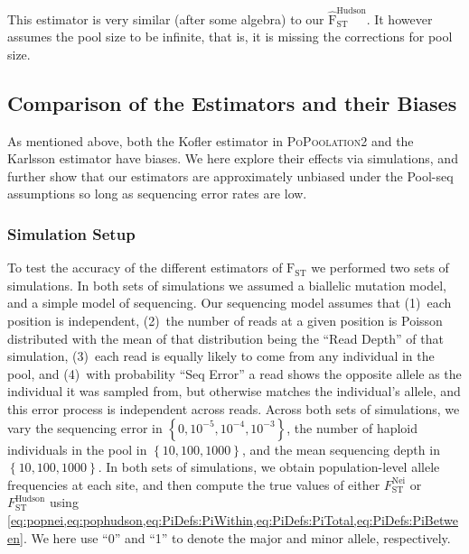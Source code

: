 \documentclass[letterpaper,fontsize=9pt,DIV=12]{scrartcl}
\newcommand\toolname{\textsc}
\newcommand{\neifst}{F_\text{ST}^\text{Nei}}
\newcommand{\hudsonfst}{F_\text{ST}^\text{Hudson}}
\begin{document}
This estimator is very similar (after some algebra) to our $\widehat{\text{F}}_\text{ST}^\text{Hudson}$.
It however assumes the pool size to be infinite, that is, it is missing the corrections for pool size.


\subsection{Comparison of the Estimators and their Biases}
\label{supp:sec:FST:sub:Comparison}

As mentioned above, both the Kofler estimator in \toolname{PoPoolation2} and the Karlsson estimator have biases.
We here explore their effects via simulations, and further show that our estimators are approximately unbiased under the Pool-seq assumptions so long as sequencing error rates are low.


\subsubsection*{Simulation Setup}
\label{supp:sec:FST:sub:Comparison:sub:Simulations}

To test the accuracy of the different estimators of $\text{F}_\text{ST}$ we performed two sets of simulations.  In both sets of simulations we assumed a biallelic mutation model, and a simple model of sequencing.  Our sequencing model assumes that (1)~each position is independent, (2)~the number of reads at a given position is Poisson distributed with the mean of that distribution being the ``Read Depth'' of that simulation, (3)~each read is equally likely to come from any individual in the pool, and (4)~with probability ``Seq Error'' a read shows the opposite allele as the individual it was sampled from, but otherwise matches the individual's allele, and this error process is independent across reads.  Across both sets of simulations, we vary the sequencing error in $\left\{0, 10^{-5}, 10^{-4}, 10^{-3}\right\}$, the number of haploid individuals in the pool in $\left\{10, 100, 1000\right\}$, and the mean sequencing depth in $\left\{10, 100, 1000\right\}$.  In both sets of simulations, we obtain population-level allele frequencies at each site, and then compute the true values of either $\neifst$ or $\hudsonfst$ using \cref{eq:popnei,eq:pophudson,eq:PiDefs:PiWithin,eq:PiDefs:PiTotal,eq:PiDefs:PiBetween}.
We here use ``0'' and ``1'' to denote the major and minor allele, respectively.
\end{document}
